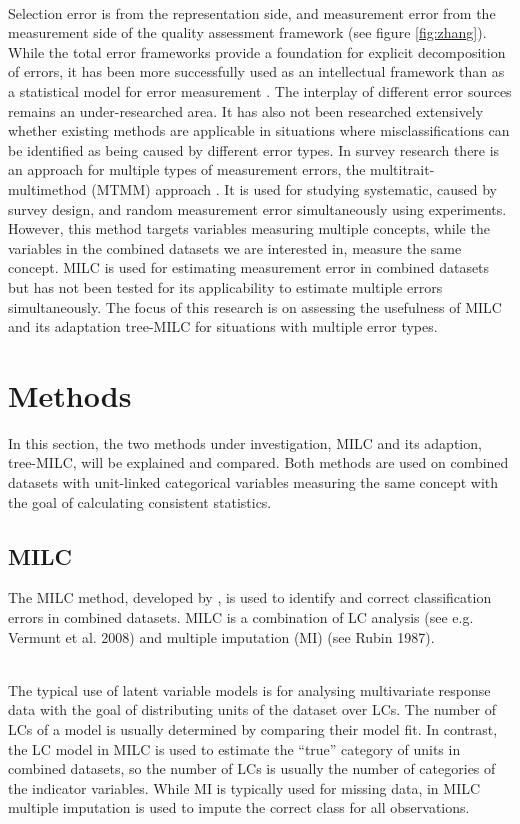 \documentclass[a4paper, 11pt]{article} %
\begin{document}
\\Selection error is from the representation side, and measurement error from the measurement side of the quality assessment framework (see figure \ref{fig:zhang}). While the total error frameworks provide a foundation for explicit decomposition of errors, it has been more successfully used as an intellectual framework than as a statistical model for error measurement \cite{Groves2010TotalSE}. The interplay of different error sources remains an under-researched area. It has also not been researched extensively whether existing methods are applicable in situations where misclassifications can be identified as being caused by different error types. In survey research there is an approach for multiple types of measurement errors, the multitrait-multimethod (MTMM) approach . It is used for studying systematic, caused by survey design, and random measurement error simultaneously using experiments. However, this method targets variables measuring multiple concepts, while the variables in the combined datasets we are interested in, measure the same concept. MILC is used for estimating measurement error in combined datasets but has not been tested for its applicability to estimate multiple errors simultaneously. The focus of this research is on assessing the usefulness of MILC and its adaptation tree-MILC for situations with multiple error types.

\section{Methods}\label{methods}
In this section, the two methods under investigation, MILC and its adaption, tree-MILC, will be explained and compared. Both methods are used on combined datasets with unit-linked categorical variables measuring the same concept with the goal of calculating consistent statistics.

\subsection{MILC}
The MILC method, developed by , is used to identify and correct classification errors in combined datasets. MILC is a combination of LC analysis (see e.g. Vermunt et al. 2008) and multiple imputation (MI) (see Rubin 1987). 

\\The typical use of latent variable models is for analysing multivariate response data with the goal of distributing units of the dataset over LCs. The number of LCs of a model is usually determined by comparing their model fit. In contrast, the LC model in MILC is used to estimate the “true” category of units in combined datasets, so the number of LCs is usually the number of categories of the indicator variables. While MI is typically used for missing data, in MILC multiple imputation is used to impute the correct class for all observations.
\end{document}

